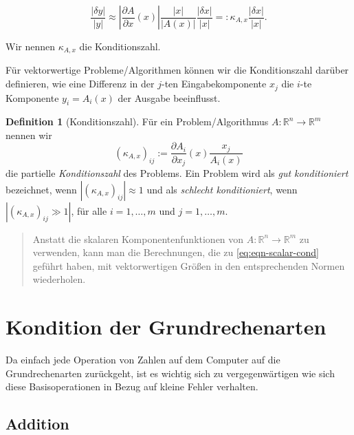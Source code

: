 \documentclass[
]{book}
\newenvironment {JHSAYS} [0] {\begin{quote}\color{jhsc}} {\end{quote}}
\theoremstyle{definition}
\newtheorem{definition}{Definition}[chapter]
\theoremstyle{definition}
\theoremstyle{definition}
\theoremstyle{definition}
\theoremstyle{remark}
\begin{document}
\begin{equation}
\frac{|\delta y|}{|y|} \approx |\frac{\partial A}{\partial x}(x)|\frac{|x|}{|A(x)|}\frac{|\delta x|}{|x|}=:\kappa_{A,x}\frac{|\delta x|}{|x|}.
\label{eq:eqn-scalar-cond}
\end{equation}

Wir nennen \(\kappa_{A,x}\) die Konditionszahl.

Für vektorwertige Probleme/Algorithmen können wir die Konditionszahl darüber definieren, wie eine Differenz in der \(j\)-ten Eingabekomponente \(x_j\) die \(i\)-te Komponente \(y_i=A_i(x)\) der Ausgabe beeinflusst.

\begin{definition}[Konditionszahl]
\protect\hypertarget{def:condition}{}\label{def:condition}Für ein Problem/Algorithmus \(A\colon \mathbb R^{n}\to \mathbb R^{m}\) nennen wir
\begin{equation*}
(\kappa_{A,x})_{ij} := \frac{\partial A_i}{\partial x_j}(x) \frac{x_j}{A_i(x)}
\end{equation*}
die partielle \emph{Konditionszahl} des Problems. Ein Problem wird als \emph{gut konditioniert} bezeichnet, wenn \(|(\kappa_{A,x})_{ij}|\approx 1\) und als \emph{schlecht konditioniert}, wenn \(|(\kappa_{A,x})_{ij}\gg 1|\), für alle \(i=1,\dotsc,m\) und \(j=1,\dotsc,m\).
\end{definition}

\leavevmode{}%
\begin{JHSAYS}
Anstatt die skalaren Komponentenfunktionen von \(A\colon \mathbb R^{n} \to \mathbb R^{m}\) zu verwenden, kann man die Berechnungen, die zu \eqref{eq:eqn-scalar-cond} geführt haben, mit vektorwertigen Größen in den entsprechenden Normen wiederholen.

\end{JHSAYS}

\hypertarget{kondition-der-grundrechenarten}{%
\section{Kondition der Grundrechenarten}\label{kondition-der-grundrechenarten}}

Da einfach jede Operation von Zahlen auf dem Computer auf die Grundrechenarten zurückgeht, ist es wichtig sich zu vergegenwärtigen wie sich diese Basisoperationen in Bezug auf kleine Fehler verhalten.

\hypertarget{addition}{%
\subsection{Addition}\label{addition}}
\end{document}
